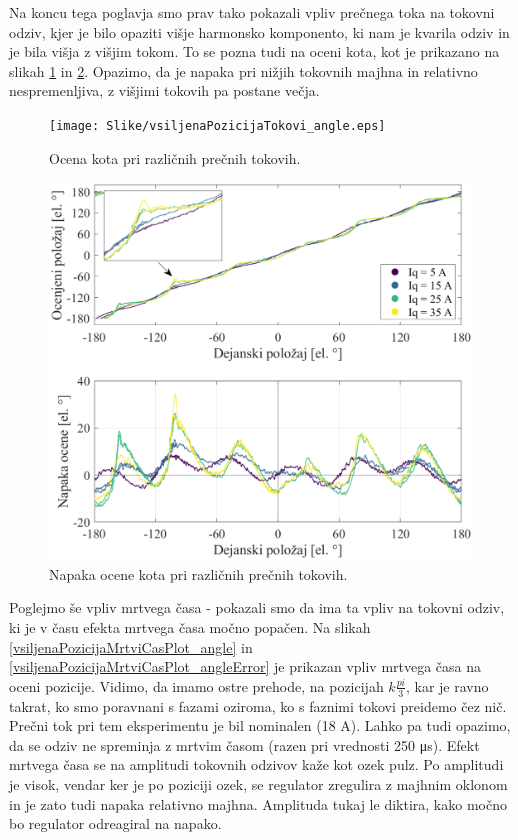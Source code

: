 \documentclass[a4paper,twoside,openright,12pt,slovene]{book}
\begin{document}
Na koncu tega poglavja smo prav tako pokazali vpliv prečnega toka na tokovni odziv, kjer je bilo opaziti višje harmonsko komponento, ki nam je kvarila odziv in je bila višja z višjim tokom. To se pozna
tudi na oceni kota, kot je prikazano na slikah \ref{vsiljenaPozicijaTokovi_angle} in \ref{vsiljenaPozicijaTokovi_angleError}. Opazimo, da je napaka pri nižjih tokovnih majhna in relativno
nespremenljiva, z višjimi tokovih pa postane večja. 

\begin{figure}[!htbp]
    \centering
    \texttt{[image: Slike/vsiljenaPozicijaTokovi\_angle.eps]}
    \caption{\label{vsiljenaPozicijaTokovi_angle} Ocena kota pri različnih prečnih tokovih. }
\end{figure}

\begin{figure}[!htbp]
    \centering
    \includegraphics[width=1.0\columnwidth]{Slike/vsiljenaPozicijaTokovi_angleError.eps}
    \caption{\label{vsiljenaPozicijaTokovi_angleError} Napaka ocene kota pri različnih prečnih tokovih. }
\end{figure}

Poglejmo še vpliv mrtvega časa - pokazali smo da ima ta vpliv na tokovni odziv, ki je v času efekta mrtvega časa močno popačen. Na slikah \ref{vsiljenaPozicijaMrtviCasPlot_angle} in
\ref{vsiljenaPozicijaMrtviCasPlot_angleError} je prikazan vpliv mrtvega časa na oceni pozicije. Vidimo, da imamo ostre prehode, na pozicijah $k\frac{pi}{3}$, kar je ravno takrat, ko smo poravnani s
fazami oziroma, ko s faznimi tokovi preidemo čez nič. Prečni tok pri tem eksperimentu je bil nominalen (18 A). Lahko pa tudi opazimo, da se odziv ne spreminja z mrtvim časom (razen pri vrednosti
250 μs). Efekt mrtvega časa se na amplitudi tokovnih odzivov kaže kot ozek pulz. Po amplitudi je visok, vendar ker je po poziciji ozek, se regulator zregulira z majhnim oklonom in je zato tudi napaka
relativno majhna. Amplituda tukaj le diktira, kako močno bo regulator odreagiral na napako.
\end{document}
